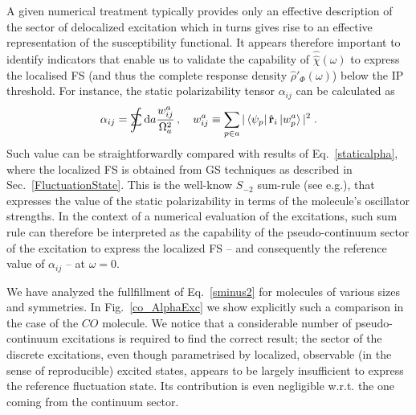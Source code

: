 \documentclass[reprint,aps,prb]{revtex4-1}
\newcommand{\dd}{{\rm d}}
\newcommand{\sint}{\mathrlap{\displaystyle\int}
\mathrlap{\textstyle\sum}
\phantom{\mathrlap{\displaystyle
\int}\textstyle\sum}}
\newcommand{\be}{\begin{equation}}
\newcommand{\ee}{\end{equation}}
\newcommand{\lb}{\label}
\newcommand{\op}[1]{\hat {#1}}
\newcommand{\sop}[1]{\op{\op {#1}}}
\newcommand{\dm}{\op{\rho}}
\begin{document}
A given numerical treatment typically provides only an effective description of the sector of delocalized excitation which in turns gives rise to an effective
representation of the susceptibility functional. It appears therefore important to identify indicators that enable us to validate the capability
of $\sop \chi(\omega)$ to express the localised FS (and thus the complete response density $\dm'_\Phi(\omega)$) below the IP threshold.
For instance, the static polarizability tensor $\alpha_{ij}$ can be calculated as
\be\lb{sminus2}
\alpha_{ij} = \sint \dd a \frac{w^a_{ij}}{\Omega_a^2}\,, \quad w^a_{ij} \equiv \sum_{p\in a} |\bra{\psi_p} \op {\mathbf r}_i \ket{w_p^a}|^2 \;.
\ee
Such value can be straightforwardly compared with results of Eq.~\eqref{staticalpha}, where the localized FS is obtained from GS techniques as
described in Sec.~\ref{FluctuationState}.
This is the well-know $S_{-2}$ sum-rule (see e.g.\cite{Wagner2012}), that expresses the value of the static polarizability
in terms of the molecule's oscillator strengths.
In the context of a numerical evaluation of the excitations, such sum rule can therefore be interpreted as the capability of the pseudo-continuum sector of the excitation to
express the localized FS -- and consequently the reference value of $\alpha_{ij}$ -- at $\omega=0$.

We have analyzed the fullfillment of Eq.~\eqref{sminus2} for molecules of various
sizes and symmetries.
In Fig.~\ref{co_AlphaExc} we show explicitly such a comparison in the case of the $CO$ molecule.
We notice that a considerable number of pseudo-continuum excitations is required
to find the correct result; the sector of the discrete excitations, even though
parametrised by localized, observable (in the sense of reproducible) excited states,
appears to be largely insufficient to express the reference fluctuation state. Its contribution is even negligible w.r.t.
the one coming from the continuum sector.
\end{document}
